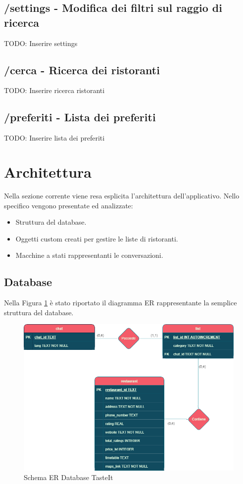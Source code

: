 \documentclass[a4paper, 12pt]{article}
\begin{document}
	\subsection{/settings - Modifica dei filtri sul raggio di ricerca}
	TODO: Inserire settings
	
	\subsection{/cerca - Ricerca dei ristoranti}
	TODO: Inserire ricerca ristoranti
	
	\subsection{/preferiti - Lista dei preferiti}
	TODO: Inserire lista dei preferiti
	
	\newpage
	\section{Architettura}
	Nella sezione corrente viene resa esplicita l'architettura dell'applicativo. Nello specifico vengono presentate ed analizzate:
	\begin{itemize}
		\item Struttura del database.
		\item Oggetti custom creati per gestire le liste di ristoranti.
		\item Macchine a stati rappresentanti le conversazioni.
	\end{itemize}
	\subsection{Database}
	Nella Figura \ref{fig:ER_image} è stato riportato il diagramma ER rappresentante la semplice struttura del database.
	\begin{figure}[h!]
		\centering
		\includegraphics[scale=0.7]{tasteItDb.png}
		\caption{Schema ER Database TasteIt}
		\label{fig:ER_image}
	\end{figure}
\end{document}
